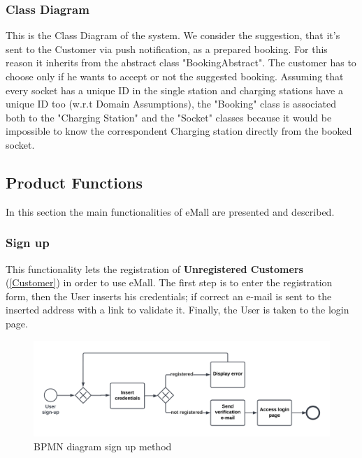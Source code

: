 \subsubsection{Class Diagram}
This is the Class Diagram of the system.
We consider the suggestion, that it's sent to the Customer via push notification, as a prepared booking. For this reason it inherits from the abstract class "BookingAbstract". The customer has to choose only if he wants to accept or not the suggested booking.
Assuming that every socket has a unique ID in the single station and charging stations have a unique ID too (w.r.t Domain Assumptions), the "Booking" class is associated both to the "Charging Station" and the "Socket" classes because it would be impossible to know the correspondent Charging station directly from the booked socket.





\subsection{Product Functions}
In this section the main functionalities of eMall are presented and described.
\subsubsection{Sign up}
This functionality lets the registration of \textbf{Unregistered Customers} (\ref{Customer}) in order to use eMall. The first step is to enter the registration form, then the User inserts his credentials; if correct an e-mail is sent to the inserted address with a link to validate it. 
Finally, the User is taken to the login page.
\begin{figure}[H]
    \begin{center}
        \includegraphics[width=\textwidth]{img/fun-sign-up.png}
        \caption{BPMN diagram sign up method}
    \end{center}
\end{figure}
